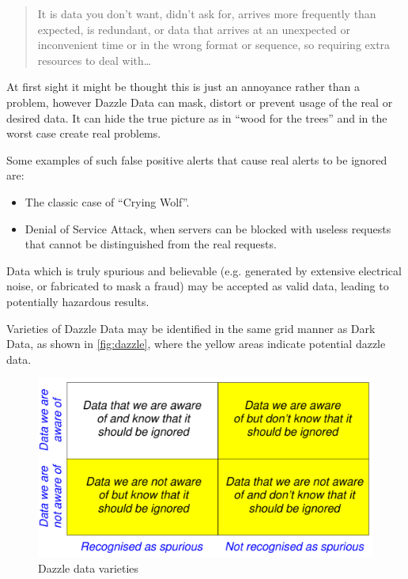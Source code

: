 \begin{quote}
  It is data you don't want, didn't ask for, arrives more frequently than expected, is redundant, or data that arrives at an unexpected or inconvenient time or in the wrong format or sequence, so requiring extra resources to deal with\dots
\end{quote}

At first sight it might be thought this is just an annoyance rather than a problem,
however Dazzle Data can mask, distort or prevent usage of the real or desired data.
It can hide the true picture as in ``wood for the trees'' and in the worst case create real problems. 

Some examples of such false positive alerts that cause real alerts to be ignored are:
\begin{itemize}
  \item The classic case of ``Crying Wolf''.
  \item Denial of Service Attack, when servers can be blocked with useless requests that cannot be distinguished from the real requests.
\end{itemize}

Data which is truly spurious and believable (e.g. generated by extensive electrical noise, or fabricated to mask a fraud) may be accepted as valid data, leading to potentially hazardous results. 

Varieties of Dazzle Data may be identified in the same grid manner as Dark Data, as shown in \autoref{fig:dazzle}, where the yellow areas indicate potential dazzle data.

\begin{figure}[htbp]
  \centering
  \includegraphics[width=\textwidth/2]{images/dazzleknowns.pdf}
  \caption{Dazzle data varieties}
  \label{fig:dazzle}
\end{figure}

